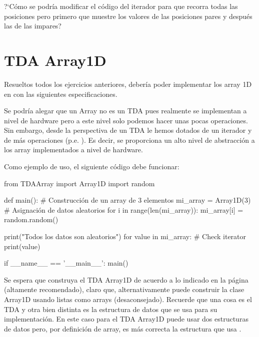 ?`Cómo se podría modificar el código del iterador para que recorra todas las posiciones pero primero que muestre los valores de las posiciones pares y después las de las impares?



%


\separacion
\section{TDA Array1D} \label{sec:arrayUnoD}


Resueltos todos los ejercicios anteriores, debería poder implementar los array 1D en  con las siguientes especificaciones.





Se podría alegar que un Array no es un TDA pues realmente se implementan a nivel de hardware pero a este nivel solo podemos hacer unas pocas operaciones. Sin embargo, desde la perspectiva de un TDA le hemos dotados de un iterador y de más operaciones (p.e. ). Es decir, se proporciona un alto nivel de abstracción a los array implementados a nivel de hardware.

Como ejemplo de uso, el siguiente código debe funcionar:
\begin{pyverbatim}[][frame=single]
from TDAArray import Array1D
import random

def main():
    # Construcción de un array de 3 elementos
    mi_array = Array1D(3)
    # Asignación de  datos  aleatorios
    for i in range(len(mi_array)):
        mi_array[i] = random.random()

    print("Todos los datos son aleatorios")
    for value in mi_array:   # Check iterator
        print(value)

if __name__ == '__main__':
    main()
\end{pyverbatim}

Se espera que construya el TDA Array1D de acuerdo a lo indicado en la página \pageref{code:array1D} (altamente recomendado), claro que, alternativamente puede construir la clase Array1D usando listas como arrays (desaconsejado). Recuerde que una cosa es el TDA y otra bien distinta es la estructura de datos que se usa para su implementación. En este caso para el TDA Array1D puede usar dos estructuras de datos pero, por definición de array, es más correcta la estructura que usa .




